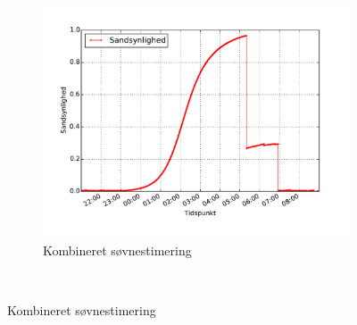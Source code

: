 \begin{frame}
{\begin{figure}
\begin{minipage}{\linewidth}
\begin{subfigure}{0.32\linewidth}
		\end{subfigure}
		\begin{subfigure}{0.32\linewidth}
			\centering
			\includegraphics[scale=0.2, trim = 1cm 1cm 1cm 1cm, clip]{../Report/grafik/kombi_figur/combined-sleep-estimate-plot}
			\caption{Kombineret søvnestimering}\label{fig:sleepcalcombine}
		\end{subfigure}
	\end{minipage}\\[1ex]%
\end{figure}
}

\end{frame}
